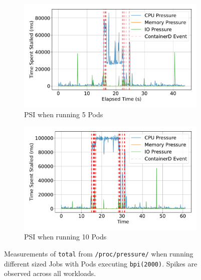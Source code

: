 \begin{figure}[ht!]
    \begin{subfigure}[b]{0.48\textwidth}
        \centering
        \includegraphics[width=\linewidth]{images/pressure-smallbatch.pdf}
        \caption{PSI when running 5 Pods} %
        \label{fig:pressure-smallbatch}
    \end{subfigure}%
    \hfill
    \begin{subfigure}[b]{0.48\textwidth}
        \centering
        \includegraphics[width=\linewidth]{images/pressure-bigbatch.pdf}
        \caption{PSI when running 10 Pods} %
        \label{fig:pressure-bigbatch}
    \end{subfigure}

    \caption{Measurements of \texttt{total} from \texttt{/proc/pressure/} when
    running different sized Jobs with Pods executing \texttt{bpi(2000)}. Spikes
    are observed across all workloads.} %
    \label{fig:pressure-combined} %
\end{figure}

